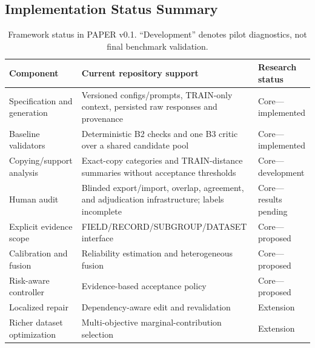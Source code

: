 \subsection{Implementation Status Summary}

\begin{table}[t]
  \centering
  \caption{Framework status in PAPER v0.1. ``Development'' denotes pilot
  diagnostics, not final benchmark validation.}
  \label{tab:framework-status}
  \begin{tabularx}{\linewidth}{@{}lXl@{}}
    \toprule
    Component & Current repository support & Research status \\
    \midrule
    Specification and generation & Versioned configs/prompts, TRAIN-only
      context, persisted raw responses and provenance & Core---implemented \\
    Baseline validators & Deterministic B2 checks and one B3 critic over a
      shared candidate pool & Core---implemented \\
    Copying/support analysis & Exact-copy categories and TRAIN-distance
      summaries without acceptance thresholds & Core---development \\
    Human audit & Blinded export/import, overlap, agreement, and adjudication
      infrastructure; labels incomplete & Core---results pending \\
    Explicit evidence scope & FIELD/RECORD/SUBGROUP/DATASET interface & Core---proposed \\
    Calibration and fusion & Reliability estimation and heterogeneous fusion & Core---proposed \\
    Risk-aware controller & Evidence-based acceptance policy & Core---proposed \\
    Localized repair & Dependency-aware edit and revalidation & Extension \\
    Richer dataset optimization & Multi-objective marginal-contribution
      selection & Extension \\
    \bottomrule
  \end{tabularx}
\end{table}
